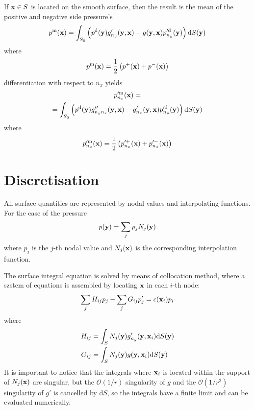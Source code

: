 \documentclass[10pt,onecolumn]{article}
\newcommand{\td}{\mathrm{d}}
\begin{document}
If ${\bf x} \in S$ is located on the smooth surface, then the result is the mean of the positive and negative side pressure's 
%
\begin{align}
p^{\mathrm{m}}({\bf x}) 
= \int_{S_0} \left(p^{\mathrm{d}}({\bf y}) g'_{n_y}({\bf y}, {\bf x}) - g({\bf y}, {\bf x}) p'^{\mathrm{d}}_{n_y}({\bf y})\right) \td S({\bf y})
\end{align}
%
where
%
\begin{equation}
p^{\mathrm{m}}({\bf x}) = \frac{1}{2}\left(p^+({\bf x})+p^-({\bf x})\right)
\end{equation}
%
differentiation with respect to $n_x$ yields
%
\begin{multline}
p'^{\mathrm{m}}_{n_x}({\bf x}) = \\ = \int_{S_0} \left(p^{\mathrm{d}}({\bf y}) g''_{n_y n_x}({\bf y}, {\bf x}) - g'_{n_x}({\bf y}, {\bf x}) p'^{\mathrm{d}}_{n_y}({\bf y})\right) \td S({\bf y})
\end{multline}
%
where
%
\begin{equation}
p'^{\mathrm{m}}_{n_x}({\bf x}) = \frac{1}{2}\left(p'^+_{n_x}({\bf x})+p'^-_{n_x}({\bf x})\right)
\end{equation}

\section{Discretisation}

All surface quantities are represented by nodal values and interpolating functions. For the case of the pressure
%
\begin{equation}
p({\bf y}) = \sum_{j} p_j N_j({\bf y})
\end{equation}
%
where $p_j$ is the $j$-th nodal value and $N_j({\bf x})$ is the corresponding interpolation function.

The surface integral equation is solved by means of collocation method, where a szstem of equations is assembled by locating ${\bf x}$ in each $i$-th node:
%
\begin{equation}
\sum_{j} H_{ij}  p_j - \sum_{j} G_{ij}  p'_j = c({\bf x}_i) p_i
\end{equation}
%
where
%
\begin{align}
H_{ij} &= \int_S N_j({\bf y}) g'_{n_y}({\bf y}, {\bf x}_i) \td S({\bf y})\\
G_{ij} &= \int_S N_j({\bf y}) g({\bf y}, {\bf x}_i) \td S({\bf y})
\end{align}
%
It is important to notice that the integrals where ${\bf x}_i$ is located within the support of $N_j({\bf x})$ are singular, but the $\mathcal{O}(1/r)$ singularity of $g$ and the $\mathcal{O}(1/r^2)$ singularity of $g'$ is cancelled by $\td S$, so the integrals have a finite limit and can be evaluated numerically.
\end{document}
